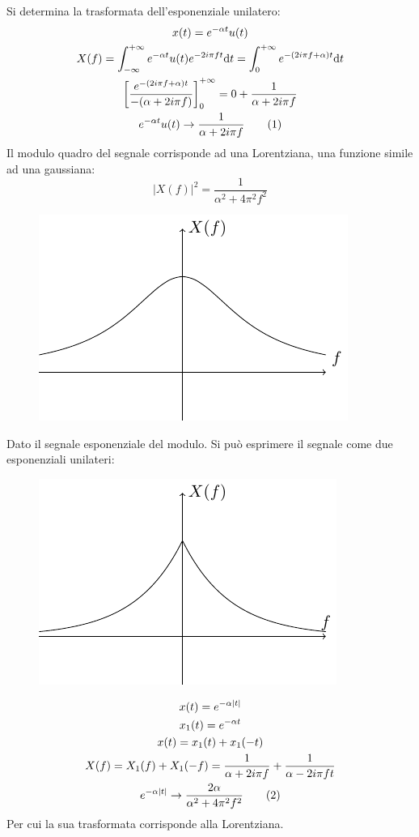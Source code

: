 \documentclass{article}
\newcommand{\df}{\mathrm{d}}
\newcommand{\tageq}{\tag{\stepcounter{equation}\theequation}}
\numberwithin{equation}{subsection}
\begin{document}
Si determina la trasformata dell'esponenziale unilatero:
\begin{gather*}
    x(t)=e^{-\alpha t}u(t)\\
    X(f)=\displaystyle\int_{-\infty}^{+\infty}e^{-\alpha t}u(t)e^{-2i\pi ft}\df t=\int_0^{+\infty}e^{-(2i\pi f+\alpha)t}\df t\\
    \left[\displaystyle\frac{e^{-(2i\pi f+\alpha)t}}{-(\alpha+2i\pi f)}\right]^{+\infty}_0=0+\frac{1}{\alpha+2i\pi f}\\
    e^{-\alpha t}u(t)\to\frac{1}{\alpha+ 2i\pi f}\tageq
\end{gather*}
Il modulo quadro del segnale corrisponde ad una Lorentziana, una funzione simile ad una gaussiana: 
\begin{equation*}
    \left|X(f)\right|^2=\frac{1}{\alpha^2+4\pi^2f^2}
\end{equation*}
\begin{figure}[H]%
    \centering
    \includegraphics{lorentziana.pdf}%
\end{figure}


Dato il segnale esponenziale del modulo. Si può esprimere il segnale come due esponenziali unilateri:
\begin{figure}[H]%
    \centering
    \includegraphics{esponenziali-unilateri.pdf}%
\end{figure}
\begin{gather*}
    x(t)=e^{-\alpha|t|}\\
    x_1(t)=e^{-\alpha t}\\
    x(t)=x_1(t)+x_1(-t)\\
    X(f)=X_1(f)+X_1(-f)=\displaystyle\frac{1}{\alpha+2i\pi f}+\frac{1}{\alpha-2i\pi ft}\\
    e^{-\alpha|t|}\to\frac{2\alpha}{\alpha^2+4\pi^2f^2}\tageq
\end{gather*}
Per cui la sua trasformata corrisponde alla Lorentziana. 
\end{document}
